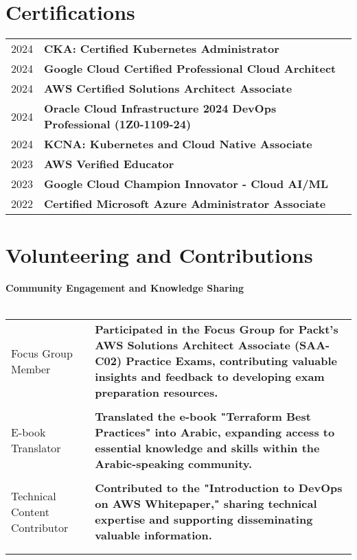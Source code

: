 \documentclass[a4paper,11pt]{article}
\begin{document}
\section{Certifications}
\begin{tabularx}{\linewidth}{@{}l X@{}}	
2024 & \textbf{CKA: Certified Kubernetes Administrator}  \\ 
2024 & \textbf{Google Cloud Certified Professional Cloud Architect} \\
2024 & \textbf{AWS Certified Solutions Architect Associate}  \\
2024 & \textbf{Oracle Cloud Infrastructure 2024 DevOps Professional (1Z0-1109-24)} \\
2024 & \textbf{KCNA: Kubernetes and Cloud Native Associate}  \\ 
2023 & \textbf{AWS Verified Educator}  \\ 
2023 & \textbf{Google Cloud Champion Innovator - Cloud AI/ML}  \\ 
2022 & \textbf{Certified Microsoft Azure Administrator Associate}  \\ 
\end{tabularx}


\section{Volunteering and Contributions}


\textbf{Community Engagement and Knowledge Sharing} \\
\\
\begin{tabularx}{\linewidth}{@{}l X@{}}	
Focus Group Member & \textbf{Participated in the Focus Group for Packt's AWS Solutions Architect Associate (SAA-C02) Practice Exams, contributing valuable insights and feedback to developing exam preparation resources.}  \\
\\
E-book Translator & \textbf{Translated the e-book "Terraform Best Practices" into Arabic, expanding access to essential knowledge and skills within the Arabic-speaking community.}  \\ 
\\
Technical Content Contributor & \textbf{Contributed to the "Introduction to DevOps on AWS Whitepaper," sharing technical expertise and supporting disseminating valuable information.}  \\ 
\\
\\
\end{tabularx}
\end{document}
